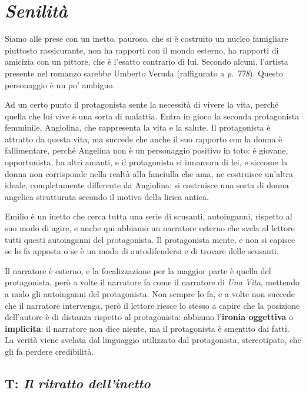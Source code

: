 \chapter{\textit{Senilità}}

Siamo alle prese con un inetto, pauroso, che si è costruito un nucleo famigliare piuttosto rassicurante, non ha rapporti con il mondo esterno, ha rapporti di amicizia con un pittore, che è l'esatto contrario di lui. Secondo alcuni, l'artista presente nel romanzo sarebbe Umberto Veruda (raffigurato a \emph{p. 778}). Questo personaggio è un po' ambiguo.

Ad un certo punto il protagonista sente la necessità di vivere la vita, perché quella che lui vive è una sorta di malattia.
Entra in gioco la seconda protagonista femminile, Angiolina, che rappresenta la vita e la salute.
Il protagonista è attratto da questa vita, ma succede che anche il suo rapporto con la donna è fallimentare, perché Angelina non è un personaggio positivo in toto: è giovane, opportunista, ha altri amanti, e il protagonista si innamora di lei, e siccome la donna non corrisponde nella realtà alla fanciulla che ama, ne costruisce un'altra ideale, completamente differente da Angiolina: si costruisce una sorta di donna angelica strutturata secondo il motivo della lirica antica.

Emilio è un inetto che cerca tutta una serie di scusanti, autoinganni, rispetto al suo modo di agire, e anche qui abbiamo un narratore esterno che svela al lettore tutti questi autoinganni del protagonista. Il protagonista mente, e non si capisce se lo fa apposta o se è un modo di autodifendersi e di trovare delle scusanti.

Il narratore è esterno, e la focalizzazione per la maggior parte è quella del protagonista, però a volte il narratore fa come il narratore di \textit{Una Vita}, mettendo a nudo gli autoinganni del protagonista. Non sempre lo fa, e a volte non succede che il narratore intervenga, però il lettore riesce lo stesso a capire che la posizione dell'autore è di distanza rispetto al protagonista: abbiamo l'\textbf{ironia oggettiva} o \textbf{implicita}: il narratore non dice niente, ma il protagonista è smentito dai fatti.
La verità viene svelata dal linguaggio utilizzato dal protagonista, stereotipato, che gli fa perdere credibilità.

\section{T: \textit{Il ritratto dell'inetto}}


